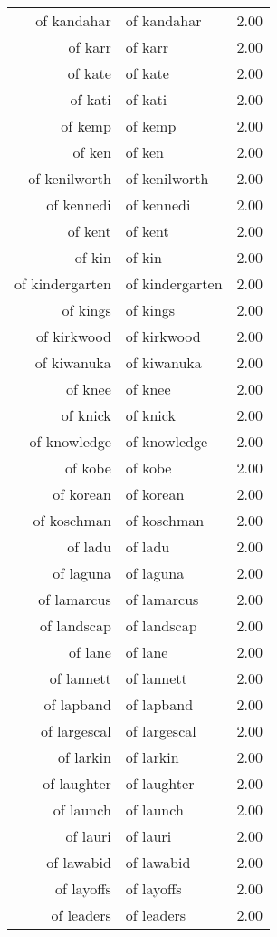\begin{table}[ht]
\begin{tabular}{rlr}
  of kandahar & of kandahar & 2.00 \\ 
  of karr & of karr & 2.00 \\ 
  of kate & of kate & 2.00 \\ 
  of kati & of kati & 2.00 \\ 
  of kemp & of kemp & 2.00 \\ 
  of ken & of ken & 2.00 \\ 
  of kenilworth & of kenilworth & 2.00 \\ 
  of kennedi & of kennedi & 2.00 \\ 
  of kent & of kent & 2.00 \\ 
  of kin & of kin & 2.00 \\ 
  of kindergarten & of kindergarten & 2.00 \\ 
  of kings & of kings & 2.00 \\ 
  of kirkwood & of kirkwood & 2.00 \\ 
  of kiwanuka & of kiwanuka & 2.00 \\ 
  of knee & of knee & 2.00 \\ 
  of knick & of knick & 2.00 \\ 
  of knowledge & of knowledge & 2.00 \\ 
  of kobe & of kobe & 2.00 \\ 
  of korean & of korean & 2.00 \\ 
  of koschman & of koschman & 2.00 \\ 
  of ladu & of ladu & 2.00 \\ 
  of laguna & of laguna & 2.00 \\ 
  of lamarcus & of lamarcus & 2.00 \\ 
  of landscap & of landscap & 2.00 \\ 
  of lane & of lane & 2.00 \\ 
  of lannett & of lannett & 2.00 \\ 
  of lapband & of lapband & 2.00 \\ 
  of largescal & of largescal & 2.00 \\ 
  of larkin & of larkin & 2.00 \\ 
  of laughter & of laughter & 2.00 \\ 
  of launch & of launch & 2.00 \\ 
  of lauri & of lauri & 2.00 \\ 
  of lawabid & of lawabid & 2.00 \\ 
  of layoffs & of layoffs & 2.00 \\ 
  of leaders & of leaders & 2.00 \\ 

\end{tabular}
\end{table}
